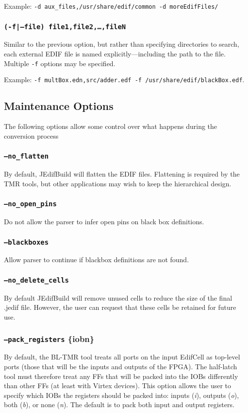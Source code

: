Example: \texttt{-d aux\_files,/usr/share/edif/common -d
  moreEdifFiles/}

\subsubsection{\texttt{(-f|--file) file1,file2,\ldots,fileN}}
Similar to the previous option, but rather than specifying directories to 
search, each external EDIF file is named explicitly---including the path to the 
file. Multiple \texttt{-f} options may be specified.

Example: \texttt{-f multBox.edn,src/adder.edf -f /usr/share/edif/blackBox.edf}.

\subsection{Maintenance Options}
The following options allow some control over what happens during the 
conversion process
  
\subsubsection{\texttt{--no\_flatten}}
By default, JEdifBuild will flatten the EDIF files. Flattening is required by the 
TMR tools, but other applications may wish to keep the hierarchical
design. 

\subsubsection{\texttt{--no\_open\_pins}}
Do not allow the parser to infer open pins on black box definitions.

\subsubsection{\texttt{--blackboxes}}
Allow parser to continue if blackbox definitions are not found.

\subsubsection{\texttt{--no\_delete\_cells}}
By default JEdifBuild will remove unused cells to reduce the size of
the final .jedif file. However, the user can request that these cells
be retained for future use.

\subsubsection{\texttt{--pack\_registers} \{i\textbar o\textbar b\textbar n\}}
By default, the BL-TMR tool treats all ports on the input EdifCell as top-level
ports (those that will be the inputs and outputs of the FPGA). The half-latch 
tool must therefore treat any FFs that will be packed into the IOBs differently
than other FFs (at least with Virtex devices). This option allows the user to
specify which IOBs the registers should be packed into: inputs (\emph{i}),
outputs (\emph{o}), both (\emph{b}), or none (\emph{n}). The default is to pack
both input and output registers.

